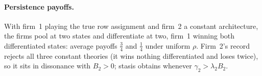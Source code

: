 \paragraph{Persistence payoffs.}
With firm~1 playing the true row assignment and firm~2 a constant
architecture, the firms pool at two states and differentiate at two, firm~1
winning both differentiated states: average payoffs $\tfrac34$ and
$\tfrac14$ under uniform $\rho$.  Firm~2's record rejects all three constant
theories (it wins nothing differentiated and loses twice), so it sits in
dissonance with $B_2>0$; stasis obtains whenever
$\gamma_2>\lambda_2B_2$.
